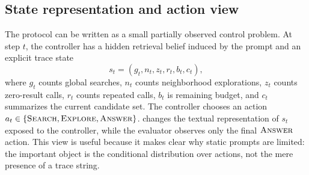 \subsection{State representation and action view}
The protocol can be written as a small partially observed control problem. At step $t$, the controller has a hidden retrieval belief induced by the prompt and an explicit trace state
\[
  s_t = (g_t, n_t, z_t, r_t, b_t, c_t),
\]
where $g_t$ counts global searches, $n_t$ counts neighborhood explorations, $z_t$ counts zero-result calls, $r_t$ counts repeated calls, $b_t$ is remaining budget, and $c_t$ summarizes the current candidate set. The controller chooses an action $a_t \in \{\textsc{Search},\textsc{Explore},\textsc{Answer}\}$. \tb changes the textual representation of $s_t$ exposed to the controller, while the evaluator observes only the final $\textsc{Answer}$ action. This view is useful because it makes clear why static prompts are limited: the important object is the conditional distribution over actions, not the mere presence of a trace string.


